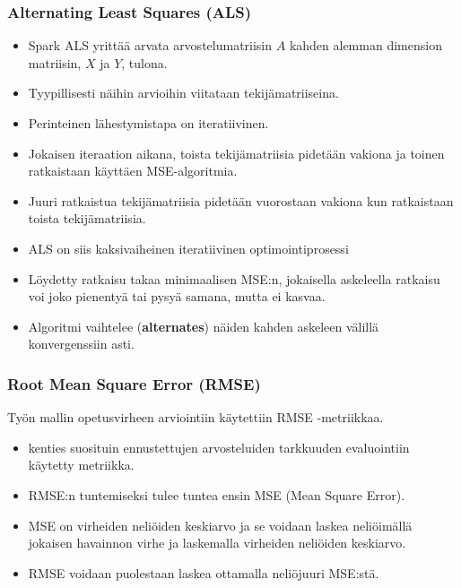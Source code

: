 \documentclass{beamer}
\begin{document}
\begin{frame}
\frametitle{Alternating Least Squares (ALS)}

\begin{itemize}
	\item Spark ALS yrittää arvata arvostelumatriisin $A$ kahden alemman dimension matriisin, $X$ ja $Y$, tulona.
	\item Tyypillisesti näihin arvioihin viitataan tekijämatriiseina.
	\item Perinteinen lähestymistapa on iteratiivinen.
	\item Jokaisen iteraation aikana, toista tekijämatriisia pidetään vakiona ja toinen ratkaistaan käyttäen MSE-algoritmia.
	\item Juuri ratkaistua tekijämatriisia pidetään vuorostaan vakiona kun ratkaistaan toista tekijämatriisia.
	\item ALS on siis kaksivaiheinen iteratiivinen optimointiprosessi
	\item Löydetty ratkaisu takaa minimaalisen MSE:n, jokaisella askeleella ratkaisu voi joko pienentyä tai pysyä samana, mutta ei kasvaa.
	\item Algoritmi vaihtelee (\textbf{alternates}) näiden kahden askeleen välillä konvergenssiin asti.
\end{itemize}

\end{frame}


\begin{frame}
\frametitle{Root Mean Square Error (RMSE)}

Työn mallin opetusvirheen arviointiin käytettiin RMSE -metriikkaa.

\begin{itemize}
	\item kenties suosituin ennustettujen arvosteluiden tarkkuuden evaluointiin käytetty metriikka.
	\item RMSE:n tuntemiseksi tulee tuntea ensin MSE (Mean Square Error).
	\item MSE on virheiden neliöiden keskiarvo ja se voidaan laskea neliöimällä jokaisen havainnon virhe ja laskemalla virheiden neliöiden keskiarvo.
	\item RMSE voidaan puolestaan laskea ottamalla neliöjuuri MSE:stä.
\end{itemize}

\end{frame}

\end{document}
